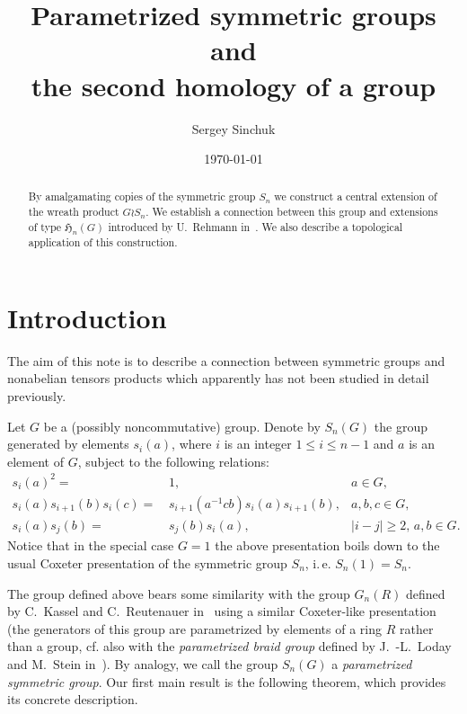 \documentclass[oneside, 10pt]{amsart}
\title[Parametrized symmetric groups]{Parametrized symmetric groups and \\ the second homology of a group}
\author {Sergey Sinchuk}
\date {\today}
\theoremstyle{plain}
\numberwithin{equation}{section}
\numberwithin{lemma}{section}
\theoremstyle{remark}
\theoremstyle{definition}
\begin{document}
\begin{abstract} By amalgamating copies of the symmetric group $S_n$ we construct a central extension of the wreath product $G \wr S_n$.
We establish a connection between this group and extensions of type $\mathfrak{H}_n(G)$ introduced by U.~Rehmann in~\cite{Reh78}. 
We also describe a topological application of this construction.
\end{abstract}

\maketitle

\section{Introduction}
The aim of this note is to describe a connection between symmetric groups and nonabelian tensors products 
 which apparently has not been studied in detail previously.
 
Let $G$ be a (possibly noncommutative) group. 
Denote by $S_n(G)$ the group generated by elements $s_i(a)$, where $i$ is an integer $1\leq i\leq n-1$ and $a$ is an element of $G$, subject to the following relations:
\begin{align}
s_i(a)^2                 = &\, 1,                                     & a \in G,                  \label{Cox1} \\
s_i(a) s_{i+1}(b) s_i(c) = &\, s_{i+1}(a^{-1}cb) s_i(a) s_{i+1}(b),   & a, b, c \in G,            \label{Cox2}  \\
s_i(a) s_j(b)            = &\, s_j(b) s_i(a),                         & |i-j|\geq 2,\, a, b\in G. \label{Cox3} 
\end{align}
Notice that in the special case $G=1$ the above presentation boils down to the usual Coxeter presentation of the symmetric group $S_n$,
 i.\,e. $S_n(1) = S_n$.
 
The group defined above bears some similarity with the group $G_n(R)$ defined by C.~Kassel and C.~Reutenauer in~\cite{KR98} using a similar Coxeter-like presentation 
 (the generators of this group are parametrized by elements of a ring $R$ rather than a group, cf. also with the {\it parametrized braid group} defined by J.~-L.~Loday and M.~Stein in~\cite{LS05}).
By analogy, we call the group $S_n(G)$ a {\it parametrized symmetric group}.
Our first main result is the following theorem, which provides its concrete description.
\end{document}
